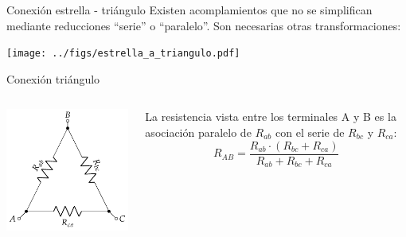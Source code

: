 \documentclass[aspectratio=169, xcolor={usenames,svgnames,dvipsnames}]{beamer}
\begin{document}

\begin{frame}{Conexión estrella - triángulo}  
    Existen acomplamientos que no se simplifican mediante reducciones ``serie'' o ``paralelo''. Son necesarias \alert{otras transformaciones}:
    \begin{center}              
        \texttt{[image: ../figs/estrella\_a\_triangulo.pdf]}
    \end{center}    
\end{frame}


\begin{frame}
{Conexión triángulo}
    \begin{columns}
    \begin{column}{0.4\columnwidth}
    \begin{center}
    \includegraphics[width=1.1\linewidth]{../figs/Conexion_Triangulo.pdf}
    \end{center}
    \end{column}
    \begin{column}{0.5\columnwidth}
    La resistencia \alert{vista entre los terminales} A y B es la asociación paralelo de $R_{ab}$ con el serie de $R_{bc}$ y $R_{ca}$:
    \begin{equation*}
      R_{AB} = \frac{R_{ab} \cdot (R_{bc} + R_{ca})}{R_{ab} + R_{bc} + R_{ca}}
    \end{equation*}


\end{column}
\end{columns}
\end{frame}
\end{document}
